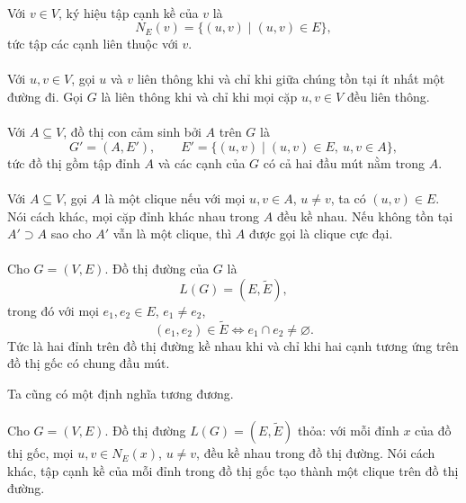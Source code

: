 \documentclass[11pt]{article}
\begin{document}
\paragraph{}
Với \(v\in V\), ký hiệu tập cạnh kề của \(v\) là
\[
  N_E(v)=\{(u,v)\mid (u,v)\in E\},
\]
tức tập các cạnh liên thuộc với \(v\).

\paragraph{}
Với \(u,v\in V\), gọi \(u\) và \(v\) liên thông khi và chỉ khi giữa chúng tồn
tại ít nhất một đường đi. Gọi \(G\) là liên thông khi và chỉ khi mọi cặp
\(u,v\in V\) đều liên thông.

\paragraph{}
Với \(A\subseteq V\), đồ thị con cảm sinh bởi \(A\) trên \(G\) là
\[
  G'=(A,E'),\qquad
  E'=\{(u,v)\mid (u,v)\in E,\ u,v\in A\},
\]
tức đồ thị gồm tập đỉnh \(A\) và các cạnh của \(G\) có cả hai đầu mút nằm trong
\(A\).

\paragraph{}
Với \(A\subseteq V\), gọi \(A\) là một clique nếu với mọi \(u,v\in A\),
\(u\ne v\), ta có \((u,v)\in E\). Nói cách khác, mọi cặp đỉnh khác nhau trong
\(A\) đều kề nhau. Nếu không tồn tại \(A'\supset A\) sao cho \(A'\) vẫn là một
clique, thì \(A\) được gọi là clique cực đại.

\paragraph{}
Cho \(G=(V,E)\). Đồ thị đường của \(G\) là
\[
  L(G)=(E,\widetilde E),
\]
trong đó với mọi \(e_1,e_2\in E\), \(e_1\ne e_2\),
\[
  (e_1,e_2)\in \widetilde E
  \Longleftrightarrow e_1\cap e_2\ne \varnothing.
\]
Tức là hai đỉnh trên đồ thị đường kề nhau khi và chỉ khi hai cạnh tương ứng
trên đồ thị gốc có chung đầu mút.

Ta cũng có một định nghĩa tương đương.

\paragraph{}
Cho \(G=(V,E)\). Đồ thị đường \(L(G)=(E,\widetilde E)\) thỏa: với mỗi đỉnh
\(x\) của đồ thị gốc, mọi \(u,v\in N_E(x)\), \(u\ne v\), đều kề nhau trong đồ
thị đường. Nói cách khác, tập cạnh kề của mỗi đỉnh trong đồ thị gốc tạo thành
một clique trên đồ thị đường.
\end{document}

